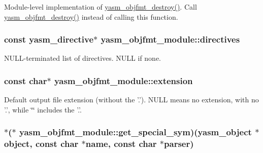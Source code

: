 Module-\/level implementation of \hyperlink{objfmt_8h_ab8a5edb3ea79eb42de7d365cbd48ef5e}{yasm\-\_\-objfmt\-\_\-destroy()}. Call \hyperlink{objfmt_8h_ab8a5edb3ea79eb42de7d365cbd48ef5e}{yasm\-\_\-objfmt\-\_\-destroy()} instead of calling this function. \hypertarget{structyasm__objfmt__module_aad3cc13272a095a1c055704c80c66210}{
\subsubsection[{directives}]{\setlength{\rightskip}{0pt plus 5cm}const {\bf yasm\-\_\-directive}$\ast$ yasm\-\_\-objfmt\-\_\-module\-::directives}}\label{structyasm__objfmt__module_aad3cc13272a095a1c055704c80c66210}
N\-U\-L\-L-\/terminated list of directives. N\-U\-L\-L if none. \hypertarget{structyasm__objfmt__module_a9fb2337cdc2e80397d185f2e4e04b5ea}{
\subsubsection[{extension}]{\setlength{\rightskip}{0pt plus 5cm}const char$\ast$ yasm\-\_\-objfmt\-\_\-module\-::extension}}\label{structyasm__objfmt__module_a9fb2337cdc2e80397d185f2e4e04b5ea}
Default output file extension (without the '.'). N\-U\-L\-L means no extension, with no '.', while \char`\"{}\char`\"{} includes the '.'. \hypertarget{structyasm__objfmt__module_a179f412531d7bbf10ff1a96b54eede47}{
\subsubsection[{get\-\_\-special\-\_\-sym}]{$\ast$($\ast$ yasm\-\_\-objfmt\-\_\-module\-::get\-\_\-special\-\_\-sym)({\bf yasm\-\_\-object} $\ast$object, const char $\ast${\bf name}, const char $\ast$parser)}}\label{structyasm__objfmt__module_a179f412531d7bbf10ff1a96b54eede47}
